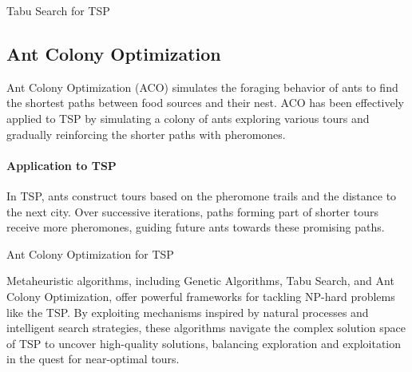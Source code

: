 \begin{algorithm}
	\caption{Tabu Search for TSP}\label{alg:tabusearch}
\end{algorithm}

\subsection{Ant Colony Optimization}

Ant Colony Optimization (ACO) simulates the foraging behavior of ants to find the shortest paths between food sources and their nest. ACO has been effectively applied to TSP by simulating a colony of ants exploring various tours and gradually reinforcing the shorter paths with pheromones.

\paragraph{Application to TSP}

In TSP, ants construct tours based on the pheromone trails and the distance to the next city. Over successive iterations, paths forming part of shorter tours receive more pheromones, guiding future ants towards these promising paths.

\begin{algorithm}
	\caption{Ant Colony Optimization for TSP}\label{alg:antcolonyoptimization}
\end{algorithm}

Metaheuristic algorithms, including Genetic Algorithms, Tabu Search, and Ant Colony Optimization, offer powerful frameworks for tackling NP-hard problems like the TSP. By exploiting mechanisms inspired by natural processes and intelligent search strategies, these algorithms navigate the complex solution space of TSP to uncover high-quality solutions, balancing exploration and exploitation in the quest for near-optimal tours.
